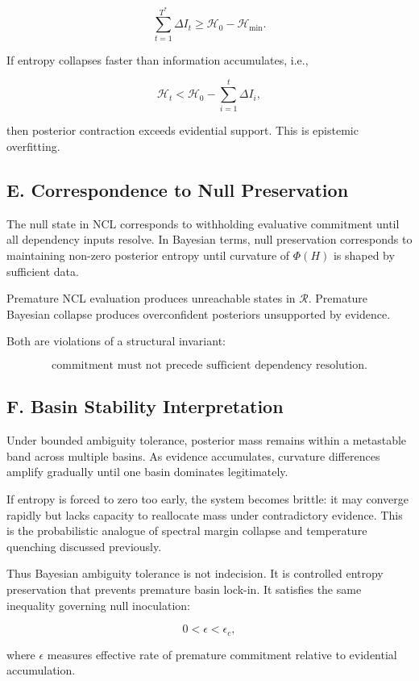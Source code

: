 \documentclass[11pt]{article}
\theoremstyle{remark}
\begin{document}
\[
\sum_{t=1}^{T^*} \Delta I_t
\ge
\mathcal{H}_0 - \mathcal{H}_{\min}.
\]

If entropy collapses faster than information accumulates, i.e.,

\[
\mathcal{H}_t
<
\mathcal{H}_0 - \sum_{i=1}^t \Delta I_i,
\]

then posterior contraction exceeds evidential support. This is epistemic overfitting.

\subsection*{E. Correspondence to Null Preservation}

The null state in NCL corresponds to withholding evaluative commitment until all dependency inputs resolve. In Bayesian terms, null preservation corresponds to maintaining non-zero posterior entropy until curvature of $\Phi(H)$ is shaped by sufficient data.

Premature NCL evaluation produces unreachable states in $\mathcal{R}$. Premature Bayesian collapse produces overconfident posteriors unsupported by evidence.

Both are violations of a structural invariant:

\[
\text{commitment must not precede sufficient dependency resolution}.
\]

\subsection*{F. Basin Stability Interpretation}

Under bounded ambiguity tolerance, posterior mass remains within a metastable band across multiple basins. As evidence accumulates, curvature differences amplify gradually until one basin dominates legitimately.

If entropy is forced to zero too early, the system becomes brittle: it may converge rapidly but lacks capacity to reallocate mass under contradictory evidence. This is the probabilistic analogue of spectral margin collapse and temperature quenching discussed previously.

Thus Bayesian ambiguity tolerance is not indecision. It is controlled entropy preservation that prevents premature basin lock-in. It satisfies the same inequality governing null inoculation:

\[
0 < \epsilon < \epsilon_c,
\]

where $\epsilon$ measures effective rate of premature commitment relative to evidential accumulation.
\end{document}
